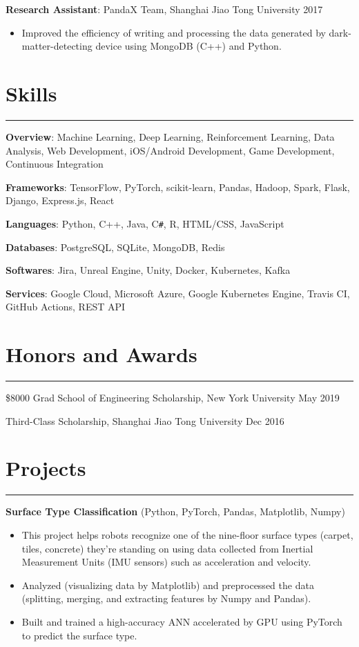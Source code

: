 \documentclass{article}
\begin{document}
\textbf{Research Assistant}: PandaX Team, Shanghai Jiao Tong University \hfill
2017

\begin{itemize}[nosep]
	\item Improved the efficiency of writing and processing the data generated by dark-matter-detecting device using
	MongoDB (C++) and Python.
\end{itemize}

\section{Skills}
\hrule
\vspace{1em}

\textbf{Overview}: Machine Learning, Deep Learning, Reinforcement Learning, Data Analysis, Web Development,
iOS/Android Development, Game Development, Continuous Integration

\textbf{Frameworks}: TensorFlow, PyTorch, scikit-learn, Pandas, Hadoop, Spark, Flask, Django, Express.js, React

\textbf{Languages}: Python, C++, Java, C\texttt{\#}, R, HTML/CSS, JavaScript

\textbf{Databases}: PostgreSQL, SQLite, MongoDB, Redis

\textbf{Softwares}: Jira, Unreal Engine, Unity, Docker, Kubernetes, Kafka

\textbf{Services}: Google Cloud, Microsoft Azure, Google Kubernetes Engine, Travis CI, GitHub Actions, REST API

\section{Honors and Awards}
\hrule
\vspace{1em}

\$8000 Grad School of Engineering Scholarship, New York University \hfill
May 2019

Third-Class Scholarship, Shanghai Jiao Tong University \hfill
Dec 2016

\section{Projects}
\hrule
\vspace{1em}

\textbf{Surface Type Classification} (Python, PyTorch, Pandas, Matplotlib, Numpy)

\begin{itemize}[nosep]
	\item This project helps robots recognize one of the nine-floor surface types (carpet, tiles, concrete) they’re standing
	on using data collected from Inertial Measurement Units (IMU sensors) such as
	acceleration and velocity.
	\item Analyzed (visualizing data by Matplotlib) and preprocessed the data (splitting, merging, and extracting features by
	Numpy and Pandas).
	\item Built and trained a high-accuracy ANN accelerated by GPU using PyTorch to predict the
	surface type.
\end{itemize}
\end{document}
